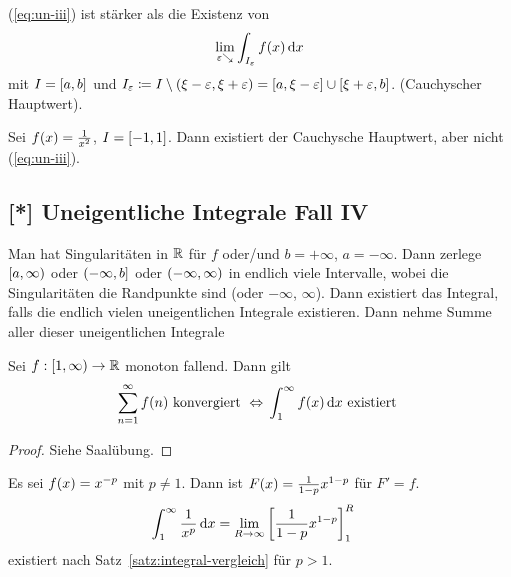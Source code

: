 \begin{bemerkung}
(\ref{eq:un-iii})
    ist stärker als die Existenz von
    \begin{align*}
        \lim_{\varepsilon\searrow} \int_{I_{\varepsilon}}^{} f\of{x} \dif x
    \end{align*}
    mit $I=\left[a,b\right]$ und $I_{\varepsilon}\coloneqq I\setminus\left(\xi-\varepsilon, \xi+\varepsilon\right) = \left[a, \xi-\varepsilon\right] \cup \left[\xi+\varepsilon, b\right]$. (Cauchyscher Hauptwert).
\end{bemerkung}

\begin{beispiel}
    Sei $f\of{x} = \frac{1}{x^2}$, $I=\left[-1, 1\right]$. Dann existiert der Cauchysche Hauptwert, aber nicht (\ref{eq:un-iii}).
\end{beispiel}

\newpage

\subsection{[*] Uneigentliche Integrale Fall IV}

\begin{definition}
    Man hat Singularitäten in $\mathbb{R}$ für $f$ oder/und $b=+\infty$, $a=-\infty$. Dann zerlege $\left[a, \infty\right)$ oder $\left(-\infty, b\right]$ oder $\left(-\infty, \infty\right)$ in endlich viele Intervalle, wobei die Singularitäten die Randpunkte sind (oder $-\infty$, $\infty$). Dann existiert das Integral, falls die endlich vielen uneigentlichen Integrale existieren. Dann nehme Summe aller dieser uneigentlichen Integrale
\end{definition}

\begin{satz}[Integralvergleichskriterium] %
    \label{satz:integral-vergleich}
    Sei $f: \left[1, \infty\right) \rightarrow{}\mathbb{R}$ monoton fallend. Dann gilt
    \begin{align*}
        \sum_{n=1}^{\infty}  f\of{n} \text{ konvergiert } \equivalent \int_{1}^{\infty} f\of{x} \dif x \text{ existiert }
    \end{align*}
    \begin{proof}
        Siehe Saalübung.
    \end{proof}
\end{satz}

\begin{beispiel}
    Es sei $f\of{x} = x^{-p}$ mit $p\neq 1$. Dann ist $F\of{x} = \frac{1}{1-p}x^{1-p}$ für $F'=f$.
    \begin{align*}
        \int_{1}^{\infty} \frac{1}{x^p} \mathop{}\!\mathrm{d} x &= \lim_{R\rightarrow{}\infty} \left[\frac{1}{1-p}x^{1-p}\right]_1^R
    \end{align*}
    existiert nach Satz~\ref{satz:integral-vergleich} für $p>1$.
\end{beispiel}

